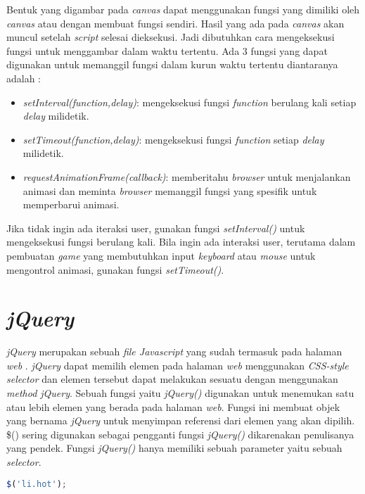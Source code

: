 Bentuk yang digambar pada \textit{canvas} dapat menggunakan fungsi yang dimiliki oleh \textit{canvas} atau dengan membuat fungsi sendiri. Hasil yang ada pada \textit{canvas} akan muncul setelah \textit{script} selesai dieksekusi. Jadi dibutuhkan cara mengeksekusi fungsi untuk menggambar dalam waktu tertentu. Ada 3 fungsi yang dapat digunakan untuk memanggil fungsi dalam kurun waktu tertentu diantaranya adalah :

\begin{itemize}
	\item \textit{setInterval(function,delay)}: mengeksekusi fungsi \textit{function} berulang kali setiap \textit{delay} milidetik.
	\item \textit{setTimeout(function,delay)}: mengeksekusi fungsi \textit{function} setiap \textit{delay} milidetik.
	\item \textit{requestAnimationFrame(callback)}: memberitahu \textit{browser} untuk menjalankan animasi dan meminta \textit{browser} memanggil fungsi yang spesifik untuk memperbarui animasi.
\end{itemize}

Jika tidak ingin ada iteraksi user, gunakan fungsi \textit{setInterval()} untuk mengeksekusi fungsi berulang kali. Bila ingin ada interaksi user, terutama dalam pembuatan \textit{game} yang membutuhkan input \textit{keyboard} atau \textit{mouse} untuk mengontrol animasi, gunakan fungsi \textit{setTimeout()}.

\section{\textit{jQuery}}
\textit{jQuery} merupakan sebuah \textit{file Javascript} yang sudah termasuk pada halaman \textit{web} \cite{duckett2014javascript}. \textit{jQuery} dapat memilih elemen pada halaman \textit{web} menggunakan \textit{CSS-style selector} dan elemen tersebut dapat melakukan sesuatu dengan menggunakan \textit{method jQuery}. Sebuah fungsi yaitu \textit{jQuery()} digunakan untuk menemukan satu atau lebih elemen yang berada pada halaman \textit{web}. Fungsi ini membuat objek yang bernama \textit{jQuery} untuk menyimpan referensi dari elemen yang akan dipilih. \$() sering digunakan sebagai pengganti fungsi \textit{jQuery()} dikarenakan penulisanya yang pendek. Fungsi \textit{jQuery()} hanya memiliki sebuah parameter yaitu sebuah \textit{selector}.

\begin{lstlisting}[language=Javascript, caption=Mendapatkan elemen menggunakan \textit{CSS-style selector}, label={lst:jQuery1}]
	$('li.hot');
\end{lstlisting}

